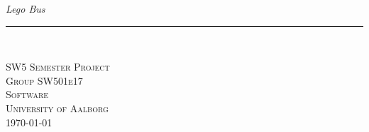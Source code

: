 \thispagestyle{empty}
\begin{center}
\vspace{3cm}

\phantom{hul}

\phantom{hul}

\phantom{hul}

\textsl{\Huge Lego Bus} \\ \vspace{1cm}

\rule{13cm}{1mm} \\ \vspace{1.5cm}
\vspace{1cm}


\vspace{2cm} 
\textsc{\Large SW5 Semester Project \\
Group SW501e17 \\
Software\\
University of Aalborg\\\today\\}
\end{center}